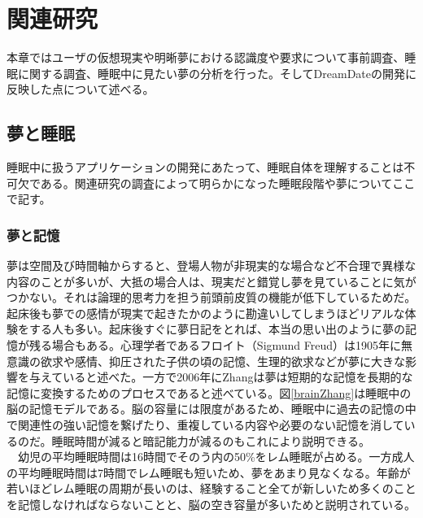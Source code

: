 \chapter{関連研究}
\label{chap:webapi}

本章ではユーザの仮想現実や明晰夢における認識度や要求について事前調査、睡眠に関する調査、睡眠中に見たい夢の分析を行った。そしてDreamDateの開発に反映した点について述べる。

\section{夢と睡眠}
睡眠中に扱うアプリケーションの開発にあたって、睡眠自体を理解することは不可欠である。関連研究の調査によって明らかになった睡眠段階や夢についてここで記す。

\subsection{夢と記憶}
夢は空間及び時間軸からすると、登場人物が非現実的な場合など不合理で異様な内容のことが多いが、大抵の場合人は、現実だと錯覚し夢を見ていることに気がつかない。それは論理的思考力を担う前頭前皮質の機能が低下しているためだ\cite{cortex}。起床後も夢での感情が現実で起きたかのように勘違いしてしまうほどリアルな体験をする人も多い。起床後すぐに夢日記をとれば、本当の思い出のように夢の記憶が残る場合もある。心理学者であるフロイト（Sigmund Freud）は1905年に無意識の欲求や感情、抑圧された子供の頃の記憶、生理的欲求などが夢に大きな影響を与えていると述べた\cite{freud}。一方で2006年にZhangは夢は短期的な記憶を長期的な記憶に変換するためのプロセスであると述べている。図\ref{brainZhang}は睡眠中の脳の記憶モデルである\cite{Zhang}。脳の容量には限度があるため、睡眠中に過去の記憶の中で関連性の強い記憶を繋げたり、重複している内容や必要のない記憶を消しているのだ\cite{Zhang}。睡眠時間が減ると暗記能力が減るのもこれにより説明できる。\\
　幼児の平均睡眠時間は16時間でそのう内の50\%をレム睡眠が占める。一方成人の平均睡眠時間は7時間でレム睡眠も短いため、夢をあまり見なくなる。年齢が若いほどレム睡眠の周期が長いのは、経験すること全てが新しいため多くのことを記憶しなければならないことと、脳の空き容量が多いためと説明されている\cite{Zhang}。

